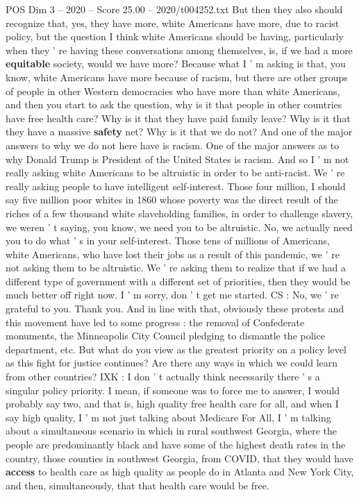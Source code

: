 \begin{textsample}{POS Dim 3 – 2020 – Score 25.00 – 2020/t004252.txt}
But then they also should recognize that, yes, they have more, white Americans have more, due to racist policy, but the question I think white Americans should be having, particularly when they ' re having these conversations among themselves, is, if we had a more \textbf{equitable} society, would we have more?
Because what I ' m asking is that, you know, white Americans have more because of racism, but there are other groups of people in other Western democracies who have more than white Americans, and then you start to ask the question, why is it that people in other countries have free health care?
Why is it that they have paid family leave?
Why is it that they have a massive \textbf{safety} net?
Why is it that we do not?
And one of the major answers to why we do not here have is racism.
One of the major answers as to why Donald Trump is President of the United States is racism.
And so I ' m not really asking white Americans to be altruistic in order to be anti-racist.
We ' re really asking people to have intelligent self-interest.
Those four million, I should say five million poor whites in 1860 whose poverty was the direct result of the riches of a few thousand white slaveholding families, in order to challenge slavery, we weren ' t saying, you know, we need you to be altruistic.
No, we actually need you to do what ' s in your self-interest.
Those tens of millions of Americans, white Americans, who have lost their jobs as a result of this pandemic, we ' re not asking them to be altruistic.
We ' re asking them to realize that if we had a different type of government with a different set of priorities, then they would be much better off right now.
I ' m sorry, don ' t get me started.
CS : No, we ' re grateful to you.
Thank you.
And in line with that, obviously these protests and this movement have led to some progress : the removal of Confederate monuments, the Minneapolis City Council pledging to dismantle the police department, etc.
But what do you view as the greatest priority on a policy level as this fight for justice continues?
Are there any ways in which we could learn from other countries?
IXK : I don ' t actually think necessarily there ' s a singular policy priority.
I mean, if someone was to force me to answer, I would probably say two, and that is, high quality free health care for all, and when I say high quality, I ' m not just talking about Medicare For All, I ' m talking about a simultaneous scenario in which in rural southwest Georgia, where the people are predominantly black and have some of the highest death rates in the country, those counties in southwest Georgia, from COVID, that they would have \textbf{access} to health care as high quality as people do in Atlanta and New York City, and then, simultaneously, that that health care would be free.

\end{textsample}
